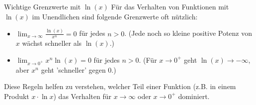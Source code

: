 \begin{infoboxumgebung}{Wichtige Grenzwerte mit \texorpdfstring{$\ln(x)$}{ln(x)}}
Für das Verhalten von Funktionen mit $\ln(x)$ im Unendlichen sind folgende Grenzwerte oft nützlich:
\begin{itemize}
    \item $\lim_{x \to \infty} \frac{\ln(x)}{x^n} = 0$ für jedes $n > 0$. (Jede noch so kleine positive Potenz von $x$ wächst schneller als $\ln(x)$.)
    \item $\lim_{x \to 0^+} x^n \ln(x) = 0$ für jedes $n > 0$. (Für $x \to 0^+$ geht $\ln(x) \to -\infty$, aber $x^n$ geht 'schneller' gegen $0$.)
\end{itemize}
Diese Regeln helfen zu verstehen, welcher Teil einer Funktion (z.B. in einem Produkt $x \cdot \ln x$) das Verhalten für $x \to \infty$ oder $x \to 0^+$ dominiert.
\end{infoboxumgebung}

